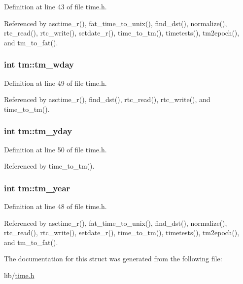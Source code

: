 Definition at line 43 of file time.\+h.



Referenced by asctime\+\_\+r(), fat\+\_\+time\+\_\+to\+\_\+unix(), find\+\_\+dst(), normalize(), rtc\+\_\+read(), rtc\+\_\+write(), setdate\+\_\+r(), time\+\_\+to\+\_\+tm(), timetests(), tm2epoch(), and tm\+\_\+to\+\_\+fat().

\subsubsection[{\texorpdfstring{tm\+\_\+wday}{tm_wday}}]{\setlength{\rightskip}{0pt plus 5cm}int tm\+::tm\+\_\+wday}\hypertarget{structtm_afe81a8c46f1c693c43f259b288859f4f}{}\label{structtm_afe81a8c46f1c693c43f259b288859f4f}


Definition at line 49 of file time.\+h.



Referenced by asctime\+\_\+r(), find\+\_\+dst(), rtc\+\_\+read(), rtc\+\_\+write(), and time\+\_\+to\+\_\+tm().

\subsubsection[{\texorpdfstring{tm\+\_\+yday}{tm_yday}}]{\setlength{\rightskip}{0pt plus 5cm}int tm\+::tm\+\_\+yday}\hypertarget{structtm_a93a0ba77cc23796df84405dcbcc57eb1}{}\label{structtm_a93a0ba77cc23796df84405dcbcc57eb1}


Definition at line 50 of file time.\+h.



Referenced by time\+\_\+to\+\_\+tm().

\subsubsection[{\texorpdfstring{tm\+\_\+year}{tm_year}}]{\setlength{\rightskip}{0pt plus 5cm}int tm\+::tm\+\_\+year}\hypertarget{structtm_a33adf78fd6476b2120ce3b9c4a852053}{}\label{structtm_a33adf78fd6476b2120ce3b9c4a852053}


Definition at line 48 of file time.\+h.



Referenced by asctime\+\_\+r(), fat\+\_\+time\+\_\+to\+\_\+unix(), find\+\_\+dst(), normalize(), rtc\+\_\+read(), rtc\+\_\+write(), setdate\+\_\+r(), time\+\_\+to\+\_\+tm(), timetests(), tm2epoch(), and tm\+\_\+to\+\_\+fat().



The documentation for this struct was generated from the following file\+:\begin{DoxyCompactItemize}
\item 
lib/\hyperlink{time_8h}{time.\+h}\end{DoxyCompactItemize}
